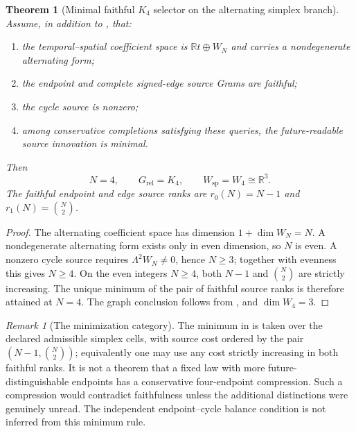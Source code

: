 \documentclass[11pt]{article}
\newtheorem{theorem}{Theorem}[section]
\numberwithin{equation}{section}
\theoremstyle{definition}
\theoremstyle{remark}
\newtheorem{remark}[remark]{Remark}
\newcommand{\R}{\mathbb R}
\begin{document}
\begin{theorem}[Minimal faithful $K_4$ selector on the alternating simplex branch]
\label{thm:supp-k4-selector}
Assume, in addition to , that:
\begin{enumerate}[label=\textup{(D\arabic*)},leftmargin=3em]
\item the temporal--spatial coefficient space is $\R t\oplus W_N$ and carries a
      nondegenerate alternating form;
\item the endpoint and complete signed-edge source Grams are faithful;
\item the cycle source is nonzero;
\item among conservative completions satisfying these queries, the
      future-readable source innovation is minimal.
\end{enumerate}
Then
\begin{equation}
 N=4,
 \qquad
 G_{\mathrm{rel}}=K_4,
 \qquad
 W_{\mathrm{sp}}=W_4\cong\R^3.
 \label{eq:supp-k4-result}
\end{equation}
The faithful endpoint and edge source ranks are
$r_0(N)=N-1$ and $r_1(N)=\binom N2$.
\end{theorem}

\begin{proof}
The alternating coefficient space has dimension
$1+\dim W_N=N$.  A nondegenerate alternating form exists only in even
dimension, so $N$ is even.  A nonzero cycle source requires
$\Lambda^2W_N\ne0$, hence $N\ge3$; together with evenness this gives $N\ge4$.
On the even integers $N\ge4$, both $N-1$ and $\binom N2$ are strictly
increasing.  The unique minimum of the pair of faithful source ranks is therefore
attained at $N=4$.  The graph conclusion follows from
, and $\dim W_4=3$.
\end{proof}

\begin{remark}[The minimization category]
The minimum in  is taken over the declared
admissible simplex cells, with source cost ordered by the pair
$(N-1,\binom N2)$; equivalently one may use any cost strictly increasing in
both faithful ranks. It is not a theorem that a fixed law with more
future-distinguishable endpoints has a conservative four-endpoint
compression. Such a compression would contradict faithfulness unless the
additional distinctions were genuinely unread. The independent
endpoint--cycle balance condition is not inferred from this minimum rule.
\end{remark}
\end{document}
